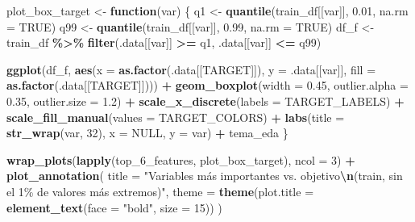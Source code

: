 \documentclass[
]{book}
\newenvironment{Shaded}{\begin{snugshade}}{\end{snugshade}}
\newcommand{\AttributeTok}[1]{\textcolor[rgb]{0.13,0.29,0.53}{#1}}
\newcommand{\ConstantTok}[1]{\textcolor[rgb]{0.56,0.35,0.01}{#1}}
\newcommand{\ControlFlowTok}[1]{\textcolor[rgb]{0.13,0.29,0.53}{\textbf{#1}}}
\newcommand{\DecValTok}[1]{\textcolor[rgb]{0.00,0.00,0.81}{#1}}
\newcommand{\FloatTok}[1]{\textcolor[rgb]{0.00,0.00,0.81}{#1}}
\newcommand{\FunctionTok}[1]{\textcolor[rgb]{0.13,0.29,0.53}{\textbf{#1}}}
\newcommand{\NormalTok}[1]{#1}
\newcommand{\OtherTok}[1]{\textcolor[rgb]{0.56,0.35,0.01}{#1}}
\newcommand{\SpecialCharTok}[1]{\textcolor[rgb]{0.81,0.36,0.00}{\textbf{#1}}}
\newcommand{\StringTok}[1]{\textcolor[rgb]{0.31,0.60,0.02}{#1}}
\begin{document}
\begin{Shaded}
\begin{Highlighting}[]
\NormalTok{plot\_box\_target }\OtherTok{\textless{}{-}} \ControlFlowTok{function}\NormalTok{(var) \{}
\NormalTok{  q1  }\OtherTok{\textless{}{-}} \FunctionTok{quantile}\NormalTok{(train\_df[[var]], }\FloatTok{0.01}\NormalTok{, }\AttributeTok{na.rm =} \ConstantTok{TRUE}\NormalTok{)}
\NormalTok{  q99 }\OtherTok{\textless{}{-}} \FunctionTok{quantile}\NormalTok{(train\_df[[var]], }\FloatTok{0.99}\NormalTok{, }\AttributeTok{na.rm =} \ConstantTok{TRUE}\NormalTok{)}
\NormalTok{  df\_f }\OtherTok{\textless{}{-}}\NormalTok{ train\_df }\SpecialCharTok{\%\textgreater{}\%} \FunctionTok{filter}\NormalTok{(.data[[var]] }\SpecialCharTok{\textgreater{}=}\NormalTok{ q1, .data[[var]] }\SpecialCharTok{\textless{}=}\NormalTok{ q99)}

  \FunctionTok{ggplot}\NormalTok{(df\_f, }\FunctionTok{aes}\NormalTok{(}\AttributeTok{x =} \FunctionTok{as.factor}\NormalTok{(.data[[TARGET]]), }\AttributeTok{y =}\NormalTok{ .data[[var]],}
                    \AttributeTok{fill =} \FunctionTok{as.factor}\NormalTok{(.data[[TARGET]]))) }\SpecialCharTok{+}
    \FunctionTok{geom\_boxplot}\NormalTok{(}\AttributeTok{width =} \FloatTok{0.45}\NormalTok{, }\AttributeTok{outlier.alpha =} \FloatTok{0.35}\NormalTok{, }\AttributeTok{outlier.size =} \FloatTok{1.2}\NormalTok{) }\SpecialCharTok{+}
    \FunctionTok{scale\_x\_discrete}\NormalTok{(}\AttributeTok{labels =}\NormalTok{ TARGET\_LABELS) }\SpecialCharTok{+}
    \FunctionTok{scale\_fill\_manual}\NormalTok{(}\AttributeTok{values =}\NormalTok{ TARGET\_COLORS) }\SpecialCharTok{+}
    \FunctionTok{labs}\NormalTok{(}\AttributeTok{title =} \FunctionTok{str\_wrap}\NormalTok{(var, }\DecValTok{32}\NormalTok{), }\AttributeTok{x =} \ConstantTok{NULL}\NormalTok{, }\AttributeTok{y =}\NormalTok{ var) }\SpecialCharTok{+}
\NormalTok{    tema\_eda}
\NormalTok{\}}

\FunctionTok{wrap\_plots}\NormalTok{(}\FunctionTok{lapply}\NormalTok{(top\_6\_features, plot\_box\_target), }\AttributeTok{ncol =} \DecValTok{3}\NormalTok{) }\SpecialCharTok{+}
  \FunctionTok{plot\_annotation}\NormalTok{(}
    \AttributeTok{title =} \StringTok{"Variables más importantes vs. objetivo}\SpecialCharTok{\textbackslash{}n}\StringTok{(train, sin el 1\% de valores más extremos)"}\NormalTok{,}
    \AttributeTok{theme =} \FunctionTok{theme}\NormalTok{(}\AttributeTok{plot.title =} \FunctionTok{element\_text}\NormalTok{(}\AttributeTok{face =} \StringTok{"bold"}\NormalTok{, }\AttributeTok{size =} \DecValTok{15}\NormalTok{))}
\NormalTok{  )}
\end{Highlighting}
\end{Shaded}
\end{document}
